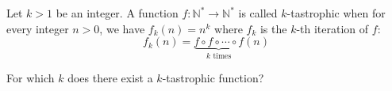 Let $k>1$ be an integer. A function $f:\mathbb{N^*}\to\mathbb{N^*}$ is called $k$-tastrophic when for every integer $n>0$,  we have $f_k(n)=n^k$ where $f_k$ is the $k$-th iteration of $f$:\[f_k(n)=\underbrace{f\circ f\circ\cdots \circ f}_{k\text{ times}}(n)\]

For which $k$ does there exist a $k$-tastrophic function?